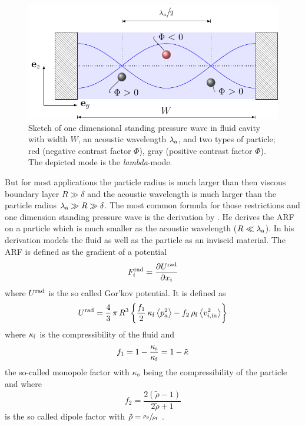 \begin{figure}[tbp]
  \centering
  \includegraphics[]{Plots/cache/lambda_mode.pdf}
  \caption{Sketch of one dimensional standing pressure wave in fluid cavity 
  with width $W$, an acoustic wavelength $\lambda_{\mathrm{a}}$, and two types 
of particle; red (negative contrast factor $\Phi$), gray (positive contrast 
factor $\Phi$). The depicted mode is the \emph{lambda}-mode.}
  \label{fig:TA-lambda_mode}
\end{figure}

But for most applications the particle radius is much larger than then viscous 
boundary layer $R \gg \delta$ and the acoustic wavelength is much larger than 
the particle radius $\lambda_{\mathrm{a}}\gg R \gg \delta$. The most common 
formula for those restrictions and one dimension standing pressure wave is the 
derivation by . He derives the ARF on a particle which is 
much smaller as the acoustic wavelength ($R\ll\lambda_{\mathrm{a}}$). In his 
derivation models the fluid as well as the particle as an inviscid material. 
The ARF is defined as the gradient of a potential
\begin{equation}
  F^{\mathrm{rad}}_{i} = \pdv{U^{\mathrm{rad}}}{x_{i}}
  \label{eq:TA-gorkov}
\end{equation}
where $U^{\mathrm{rad}}$ is the so called Gor'kov potential. It is defined as
\begin{equation}
  U^{\mathrm{rad}} = \frac{4}{3}\,\pi\,R^{3}\left\{ 
  \frac{f_{1}}{2}\,\kappa_{\mathrm{f}}\left\langle p^{2}_{\mathrm{a}} \right\rangle - 
f_{2}\,\rho_{\mathrm{f}}\left\langle v^{2}_{i,\mathrm{in}} \right\rangle \right\}
    \label{eq:TA-gorkov-potential}
\end{equation}
where $\kappa_{\mathrm{f}}$ is the compressibility of the fluid and
\begin{equation}
  f_{1} = 1 - \frac{\kappa_{\mathrm{s}}}{\kappa_{\mathrm{f}}} = 1 - \tilde{\kappa}
  \label{eq:TA-fone}
\end{equation}
the so-called monopole factor with $\kappa_{\mathrm{s}}$ being the compressibility 
of the particle and where
\begin{equation}
f_{2} = \frac{2(\tilde{\rho}-1)}{2\tilde{\rho}+1}
\label{eq:TA-ftwo}
\end{equation}
is the so called dipole factor with $\tilde{\rho} = \sfrac{\rho_{\mathrm{p}}}{\rho_{\mathrm{f}}}$ 
\cite{Gorkov1962,Bruus2012}.

